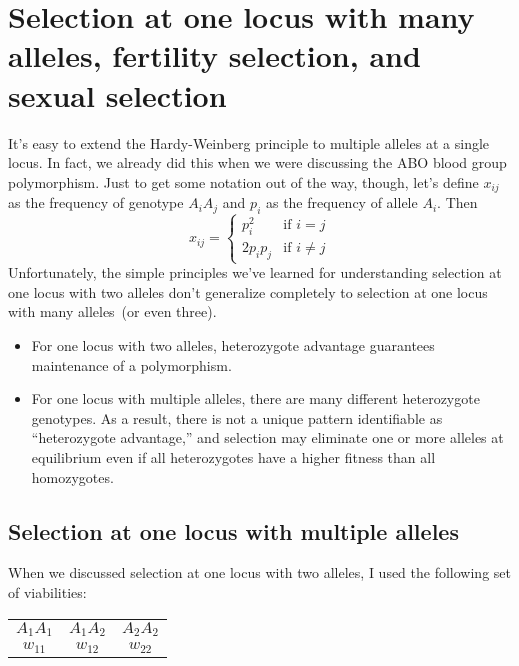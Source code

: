 \chapter{Selection at one locus with many alleles, fertility selection, and sexual selection}

It's easy to extend the Hardy-Weinberg principle to multiple alleles
at a single locus. In fact, we already did this when we were
discussing the ABO blood group polymorphism. Just to get some notation
out of the way, though, let's define $x_{ij}$ as the frequency of
genotype $A_iA_j$ and $p_i$ as the frequency of allele
$A_i$. Then
\[
x_{ij} = \left\{
\begin{array}{ll}
p_i^2   & \mbox{if $i = j$} \\
2p_ip_j & \mbox{if $i \ne j$}
\end{array}
\right.
\]
Unfortunately, the simple principles we've learned for understanding
selection at one locus with two alleles don't generalize completely to
selection at one locus with many alleles~(or even three).

\begin{itemize}

\item For one locus with two alleles, heterozygote advantage
  guarantees maintenance of a polymorphism.

\item For one locus with multiple alleles, there are many different
  heterozygote genotypes. As a result, there is not a unique pattern
  identifiable as ``heterozygote advantage,'' and selection may
  eliminate one or more alleles at equilibrium even if all
  heterozygotes have a higher fitness than all homozygotes.

\end{itemize}

\section*{Selection at one locus with multiple alleles}

When we discussed selection at one locus with two alleles, I used the
following set of viabilities:

\begin{center}
\begin{tabular}{ccc}
$A_1A_1$ & $A_1A_2$ & $A_2A_2$ \\
$w_{11}$ & $w_{12}$ & $w_{22}$
\end{tabular}
\end{center}

